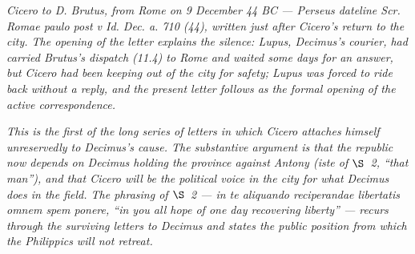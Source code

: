 
\textit{Cicero to D. Brutus, from Rome on 9 December 44 BC
--- Perseus dateline \textit{Scr. Romae paulo post v Id.
Dec. a. 710 (44)}, written just after Cicero's return to
the city. The opening of the letter explains the silence:
Lupus, Decimus's courier, had carried Brutus's dispatch
(11.4) to Rome and waited some days for an answer, but
Cicero had been keeping out of the city for safety;
Lupus was forced to ride back without a reply, and the
present letter follows as the formal opening of the
active correspondence.}

\textit{This is the first of the long series of letters in
which Cicero attaches himself unreservedly to Decimus's
cause. The substantive argument is that the republic now
depends on Decimus holding the province against Antony
(\textit{iste} of $\S$~2, ``that man''), and that Cicero
will be the political voice in the city for what
Decimus does in the field. The phrasing of $\S$~2 ---
\textit{in te aliquando reciperandae libertatis omnem spem
ponere}, ``in you all hope of one day recovering liberty''
--- recurs through the surviving letters to Decimus and
states the public position from which the Philippics will
not retreat.}
